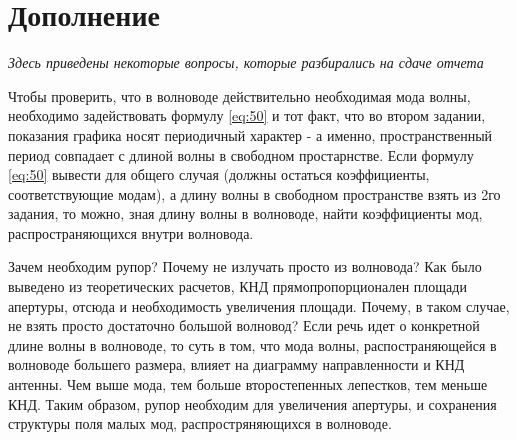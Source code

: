 \newpage
\section{Дополнение}
\textit{Здесь приведены некоторые вопросы, которые разбирались на сдаче отчета}

Чтобы проверить, что в волноводе действительно необходимая мода волны, необходимо задействовать формулу \eqref{eq:50} и
тот факт, что во втором задании, показания графика носят периодичный характер - а именно, пространственный период
совпадает с длиной волны в свободном простарнстве. Если формулу \eqref{eq:50} вывести для общего случая (должны остаться
коэффициенты, соответствующие модам), а длину волны в свободном пространстве взять из 2го задания, то можно, зная длину
волны в волноводе, найти коэффициенты мод, распространяющихся внутри волновода.

Зачем необходим рупор? Почему не излучать просто из волновода? Как было выведено из теоретических расчетов, КНД
прямопропорционален  площади апертуры, отсюда и необходимость увеличения площади. Почему, в таком случае, не взять просто
достаточно большой волновод? Если речь идет о конкретной длине волны в волноводе, то суть в том, что мода волны,
распостраняющейся в волноводе большего размера, влияет на диаграмму направленности и КНД антенны. Чем выше мода, тем
больше второстепенных лепестков, тем меньше КНД. Таким образом, рупор необходим для увеличения апертуры, и сохранения
структуры поля малых мод, распростряняющихся в волноводе.
